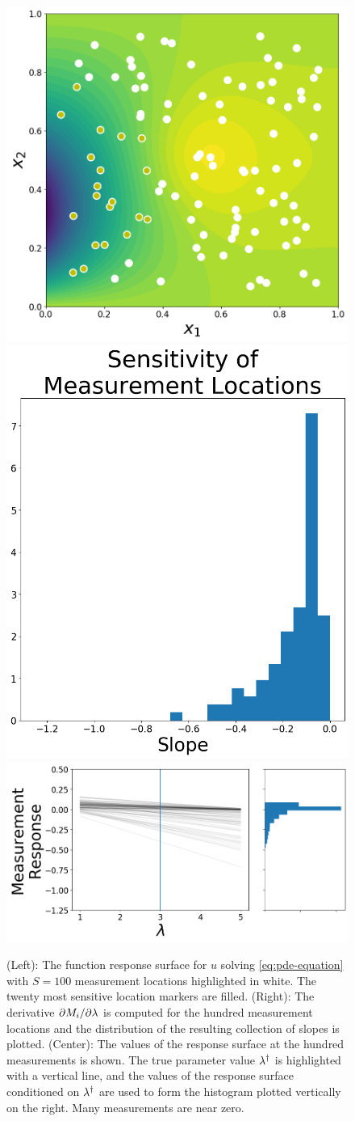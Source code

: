 \begin{figure}
\centering
  \includegraphics[width=0.35\linewidth]{figures/pde/pde_reference_solution}
  \includegraphics[width=0.35\linewidth]{figures/pde/pde_sensitivity_qoi}
  \includegraphics[width=0.675\linewidth]{figures/pde/pde_qoi_response}
\caption{(Left): The function response surface for $u$ solving \eqref{eq:pde-equation} with $S=100$ measurement locations highlighted in white.
The twenty most sensitive location markers are filled.
(Right): The derivative $\partial M_i / \partial \lambda$ is computed for the hundred measurement locations and the distribution of the resulting collection of slopes is plotted.
(Center): The values of the response surface at the hundred measurements is shown. The true parameter value $\lambda^\dagger$ is highlighted with a vertical line, and the values of the response surface conditioned on $\lambda^\dagger$ are used to form the histogram plotted vertically on the right. Many measurements are near zero.
}
\label{fig:pde-response}
\end{figure}

